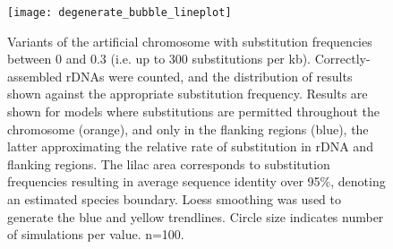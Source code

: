 \begin{figure}[!b]
  \centering
    \texttt{[image: degenerate\_bubble\_lineplot]}
  \caption{Variants of the artificial chromosome with substitution frequencies between 0 and 0.3 (i.e. up to 300 substitutions per kb). Correctly-assembled rDNAs were counted, and the distribution of results shown against the appropriate substitution frequency. Results are shown for models where substitutions are permitted throughout the chromosome (orange), and only in the flanking regions (blue), the latter approximating the relative rate of substitution in rDNA and flanking regions. The lilac area corresponds to substitution frequencies resulting in average sequence identity over 95\%, denoting an estimated species boundary. Loess smoothing was used to generate the blue and yellow trendlines. Circle size indicates number of simulations per value. n=100.}
  \label{fig:degen}
\end{figure}
